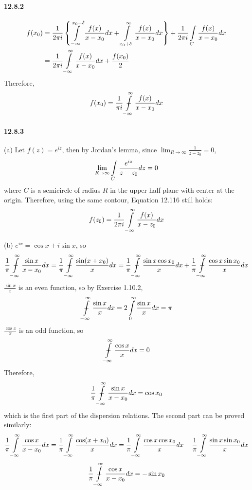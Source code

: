 \documentclass[a4paper]{article}
\begin{document}
\paragraph{12.8.2}
\begin{equation*}
    \begin{split}
        f(x_0) & =\frac{1}{2\pi i}\left\{\int\displaylimits_{-\infty}^{x_0-\delta}\frac{f(x)}{x-x_0}dx+\int\displaylimits_{x_0+\delta}^\infty\frac{f(x)}{x-x_0}dx \right\}+\frac{1}{2\pi i}\int\displaylimits_C\frac{f(x)}{x-x_0}dx\\
        & =\frac{1}{2\pi i}\ddashint\displaylimits_{-\infty}^\infty\frac{f(x)}{x-x_0}dx+\frac{f(x_0)}{2}
    \end{split}
\end{equation*}
Therefore,
\[
f(x_0)=\frac{1}{\pi i}\ddashint\displaylimits_{-\infty}^\infty\frac{f(x)}{x-x_0}dx
\]

\paragraph{12.8.3}
(a)
Let $f(z)=e^{iz}$, then by Jordan's lemma, since $\lim_{R\to\infty}\frac{1}{z-z_0}=0$,
\[
\lim_{R\to\infty}\int\displaylimits_C\frac{e^{iz}}{z-z_0}dz=0
\]
where $C$ is a semicircle of radius $R$ in the upper half-plane with center at the origin. Therefore, using the same contour, Equation 12.116 still holds:
\[
f(z_0)=\frac{1}{2\pi i}\int\displaylimits_{-\infty}^\infty\frac{f(x)}{x-z_0}dx
\]

(b)
$e^{ix}=\cos x+i\sin x$, so
\[
\frac{1}{\pi}\ddashint\displaylimits_{-\infty}^\infty\frac{\sin x}{x-x_0}dx=\frac{1}{\pi}\ddashint\displaylimits_{-\infty}^\infty\frac{\sin(x+x_0)}{x}dx=\frac{1}{\pi}\ddashint\displaylimits_{-\infty}^\infty\frac{\sin x\cos x_0}{x}dx+\frac{1}{\pi}\ddashint\displaylimits_{-\infty}^\infty\frac{\cos x\sin x_0}{x}dx
\]
$\frac{\sin x}{x}$ is an even function, so by Exercise 1.10.2,
\[
\ddashint\displaylimits_{-\infty}^\infty\frac{\sin x}{x}dx=2\int\displaylimits_0^\infty\frac{\sin x}{x}dx=\pi
\]
$\frac{\cos x}{x}$ is an odd function, so
\[
\ddashint\displaylimits_{-\infty}^\infty\frac{\cos x}{x}dx=0
\]
Therefore,
\[
\frac{1}{\pi}\ddashint\displaylimits_{-\infty}^\infty\frac{\sin x}{x-x_0}dx=\cos x_0
\]
which is the first part of the dispersion relations. The second part can be proved similarly:
\[
\frac{1}{\pi}\ddashint\displaylimits_{-\infty}^\infty\frac{\cos x}{x-x_0}dx
=\frac{1}{\pi}\ddashint\displaylimits_{-\infty}^\infty\frac{\cos(x+x_0)}{x}dx
=\frac{1}{\pi}\ddashint\displaylimits_{-\infty}^\infty\frac{\cos x\cos x_0}{x}dx-\frac{1}{\pi}\ddashint\displaylimits_{-\infty}^\infty\frac{\sin x\sin x_0}{x}dx
\]
\[
\frac{1}{\pi}\ddashint\displaylimits_{-\infty}^\infty\frac{\cos x}{x-x_0}dx=-\sin x_0
\]
\end{document}
